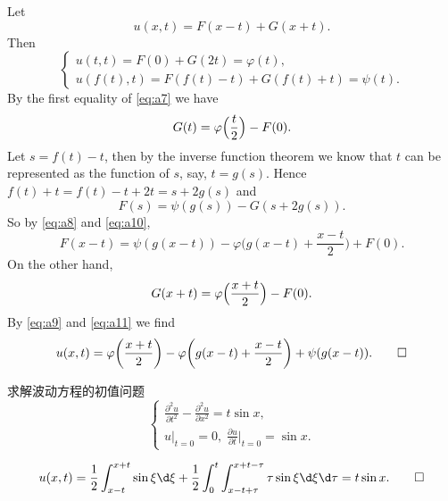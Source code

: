 \begin{solution}
  Let
  \[ u(x,t) = F(x-t) + G(x+t). \]
  Then
  \begin{equation}\label{eq:a7}
    \begin{cases}
      u(t,t) = F(0) + G(2t) = \varphi(t), \\
      u(f(t),t) = F(f(t)-t) + G(f(t)+t) = \psi(t).
    \end{cases}
  \end{equation}
  By the first equality of \eqref{eq:a7} we have
  \begin{equation}\label{eq:a10}
    G(t) = \varphi\Bigl(\frac{t}{2}\Bigr) - F(0).
  \end{equation}
  Let $s = f(t) - t$, then by the inverse function theorem we know that
  $t$ can be represented as the function of $s$, say, $t = g(s)$.
  Hence $f(t)+t = f(t)-t+2t = s + 2g(s)$ and 
  \begin{equation}\label{eq:a8}
    F(s) = \psi(g(s)) - G(s+2g(s)).
  \end{equation}
  So by \eqref{eq:a8} and \eqref{eq:a10},
  \begin{equation}\label{eq:a9}
    F(x-t) = \psi(g(x-t)) - \varphi\biggl(g(x-t) + \frac{x-t}{2}\biggr) + F(0).
  \end{equation}
  On the other hand,
  \begin{equation}\label{eq:a11}
    G(x+t) = \varphi\Bigl(\frac{x+t}{2}\Bigr) - F(0).
  \end{equation}
  By \eqref{eq:a9} and \eqref{eq:a11} we find
  \[ u(x,t) = \varphi\biggl(\frac{x+t}{2}\biggr)
    - \varphi\biggl(g(x-t) + \frac{x-t}{2}\biggr) + \psi(g(x-t)). \qedhere \]
\end{solution}


\begin{exercise}[8]
  求解波动方程的初值问题
  \[
    \begin{cases}
      \frac{\partial^2u}{\partial t^2} - \frac{\partial^2u}{\partial x^2} = t\sin x, \\
      u|_{t=0} = 0,\; \frac{\partial u}{\partial t}\Big|_{t=0} = \sin x.
    \end{cases}
  \]
\end{exercise}

\begin{solve}
  \[u(x,t) = \frac{1}{2}\int_{x-t}^{x+t}\sin \xi\d\xi
      + \frac{1}{2}\int_0^t\int_{x-t+\tau}^{x+t-\tau}\tau\sin \xi\d\xi\d\tau 
      = t\sin x.\qedhere\]
\end{solve}



